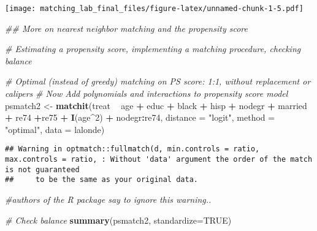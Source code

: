\documentclass[]{article}
\newenvironment{Shaded}{\begin{snugshade}}{\end{snugshade}}
\newcommand{\CommentTok}[1]{\textcolor[rgb]{0.56,0.35,0.01}{\textit{#1}}}
\newcommand{\DataTypeTok}[1]{\textcolor[rgb]{0.13,0.29,0.53}{#1}}
\newcommand{\DecValTok}[1]{\textcolor[rgb]{0.00,0.00,0.81}{#1}}
\newcommand{\KeywordTok}[1]{\textcolor[rgb]{0.13,0.29,0.53}{\textbf{#1}}}
\newcommand{\NormalTok}[1]{#1}
\newcommand{\OperatorTok}[1]{\textcolor[rgb]{0.81,0.36,0.00}{\textbf{#1}}}
\newcommand{\OtherTok}[1]{\textcolor[rgb]{0.56,0.35,0.01}{#1}}
\newcommand{\StringTok}[1]{\textcolor[rgb]{0.31,0.60,0.02}{#1}}
\begin{document}
\texttt{[image: matching\_lab\_final\_files/figure-latex/unnamed-chunk-1-5.pdf]}

\begin{Shaded}
\begin{Highlighting}[]
\CommentTok{## More on nearest neighbor matching and the propensity score}

\CommentTok{# Estimating a propensity score, implementing a matching procedure, checking balance}

\CommentTok{# Optimal (instead of greedy) matching on PS score: 1:1, without replacement or calipers}
\CommentTok{# Now Add polynomials and interactions to propensity score model}
\NormalTok{psmatch2 <-}\StringTok{ }\KeywordTok{matchit}\NormalTok{(treat }\OperatorTok{~}\StringTok{ }\NormalTok{age }\OperatorTok{+}\StringTok{ }\NormalTok{educ }\OperatorTok{+}\StringTok{ }\NormalTok{black }\OperatorTok{+}\StringTok{ }\NormalTok{hisp }\OperatorTok{+}\StringTok{ }\NormalTok{nodegr }\OperatorTok{+}\StringTok{ }\NormalTok{married }\OperatorTok{+}\StringTok{ }\NormalTok{re74 }\OperatorTok{+}\NormalTok{re75}
                    \OperatorTok{+}\StringTok{ }\KeywordTok{I}\NormalTok{(age}\OperatorTok{^}\DecValTok{2}\NormalTok{) }\OperatorTok{+}\StringTok{ }\NormalTok{nodegr}\OperatorTok{:}\NormalTok{re74,  }\DataTypeTok{distance =} \StringTok{"logit"}\NormalTok{, }\DataTypeTok{method =} \StringTok{"optimal"}\NormalTok{, }\DataTypeTok{data =}\NormalTok{ lalonde)}
\end{Highlighting}
\end{Shaded}

\begin{verbatim}
## Warning in optmatch::fullmatch(d, min.controls = ratio, max.controls = ratio, : Without 'data' argument the order of the match is not guaranteed
##     to be the same as your original data.
\end{verbatim}

\begin{Shaded}
\begin{Highlighting}[]
\CommentTok{#authors of the R package say to ignore this warning..}

\CommentTok{# Check balance}
\KeywordTok{summary}\NormalTok{(psmatch2, }\DataTypeTok{standardize=}\OtherTok{TRUE}\NormalTok{)}
\end{Highlighting}
\end{Shaded}
\end{document}

